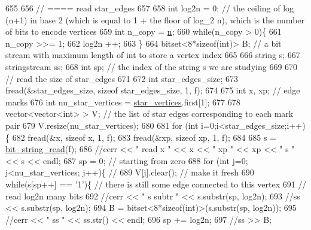 \begin{DoxyCode}
655 
656   \textcolor{comment}{// ==== read star\_edges}
657 
658   \textcolor{keywordtype}{int} log2n = 0; \textcolor{comment}{// the ceiling of log (n+1) in base 2 (which is equal to 1 + the floor of log\_2 n), which
       is the number of bits to encode vertices}
659   \textcolor{keywordtype}{int} n\_copy = \hyperlink{classmarked__graph__compressed_a8d841016ddb11cfd33748c8deb6277ba}{n};
660   \textcolor{keywordflow}{while}(n\_copy > 0)\{
661     n\_copy >>= 1;
662     log2n ++;
663   \}
664   bitset<8*sizeof(int)> B; \textcolor{comment}{// a bit stream with maximum length of int to store a vertex index}
665 
666   \textcolor{keywordtype}{string} s;
667   stringstream ss;
668   \textcolor{keywordtype}{int} sp; \textcolor{comment}{// the index of the string s we are studying }
669 
670   \textcolor{comment}{// read the size of star\_edges}
671 
672   \textcolor{keywordtype}{int} star\_edges\_size;
673   fread(&star\_edges\_size, \textcolor{keyword}{sizeof} star\_edges\_size, 1, f);
674 
675   \textcolor{keywordtype}{int} x, xp; \textcolor{comment}{// edge marks}
676   \textcolor{keywordtype}{int} nu\_star\_vertices = \hyperlink{classmarked__graph__compressed_a7a4ced4586e2e353f9076bd447df5208}{star\_vertices}.first[1];
677 
678   vector<vector<int> > V; \textcolor{comment}{// the list of star edges corresponding to each mark pair}
679   V.resize(nu\_star\_vertices);
680 
681   \textcolor{keywordflow}{for} (\textcolor{keywordtype}{int} i=0;i<star\_edges\_size;i++)\{
682     fread(&x, \textcolor{keyword}{sizeof} x, 1, f);
683     fread(&xp, \textcolor{keyword}{sizeof} xp, 1, f);
684   
685     s = \hyperlink{compression__helper_8cpp_a40e8dcbc036f96b28e003e882c4890b7}{bit\_string\_read}(f);
686     \textcolor{comment}{//cerr << " read  x " << x << " xp " << xp << " s " << s << endl;}
687     sp = 0; \textcolor{comment}{// starting from zero }
688     \textcolor{keywordflow}{for} (\textcolor{keywordtype}{int} j=0; j<nu\_star\_vertices; j++)\{ \textcolor{comment}{// }
689       V[j].clear(); \textcolor{comment}{// make it fresh}
690       \textcolor{keywordflow}{while}(s[sp++] == \textcolor{charliteral}{'1'})\{ \textcolor{comment}{// there is still some edge connected to this vertex }
691         \textcolor{comment}{// read log2n many bits}
692         \textcolor{comment}{//cerr << " s subtr " << s.substr(sp, log2n);}
693         \textcolor{comment}{//ss << s.substr(sp, log2n);}
694         B = bitset<8*sizeof(int)>(s.substr(sp, log2n));
695         \textcolor{comment}{//cerr << " ss " << ss.str() << endl;}
696         sp += log2n;
697         \textcolor{comment}{//ss >> B;}

\end{DoxyCode}
